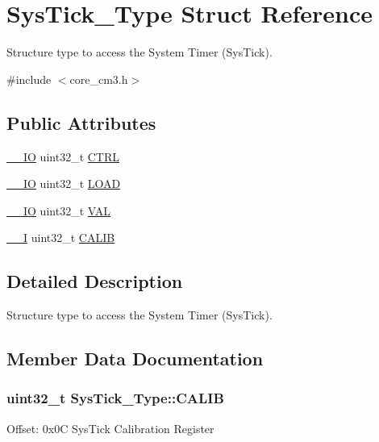 \hypertarget{struct_sys_tick___type}{\section{Sys\-Tick\-\_\-\-Type Struct Reference}
\label{struct_sys_tick___type}
}


Structure type to access the System Timer (Sys\-Tick).  




{\ttfamily \#include $<$core\-\_\-cm3.\-h$>$}

\subsection*{Public Attributes}
\begin{DoxyCompactItemize}
\item 
\hyperlink{group___c_m_s_i_s__core__definitions_gaec43007d9998a0a0e01faede4133d6be}{\-\_\-\-\_\-\-I\-O} uint32\-\_\-t \hyperlink{struct_sys_tick___type_af2ad94ac83e5d40fc6e34884bc1bec5f}{C\-T\-R\-L}
\item 
\hyperlink{group___c_m_s_i_s__core__definitions_gaec43007d9998a0a0e01faede4133d6be}{\-\_\-\-\_\-\-I\-O} uint32\-\_\-t \hyperlink{struct_sys_tick___type_ae7bc9d3eac1147f3bba8d73a8395644f}{L\-O\-A\-D}
\item 
\hyperlink{group___c_m_s_i_s__core__definitions_gaec43007d9998a0a0e01faede4133d6be}{\-\_\-\-\_\-\-I\-O} uint32\-\_\-t \hyperlink{struct_sys_tick___type_a0997ff20f11817f8246e8f0edac6f4e4}{V\-A\-L}
\item 
\hyperlink{group___c_m_s_i_s__core__definitions_gaf63697ed9952cc71e1225efe205f6cd3}{\-\_\-\-\_\-\-I} uint32\-\_\-t \hyperlink{struct_sys_tick___type_a9c9eda0ea6f6a7c904d2d75a6963e238}{C\-A\-L\-I\-B}
\end{DoxyCompactItemize}


\subsection{Detailed Description}
Structure type to access the System Timer (Sys\-Tick). 

\subsection{Member Data Documentation}
\hypertarget{struct_sys_tick___type_a9c9eda0ea6f6a7c904d2d75a6963e238}{
\subsubsection[{C\-A\-L\-I\-B}]{ uint32\-\_\-t Sys\-Tick\-\_\-\-Type\-::\-C\-A\-L\-I\-B}}\label{struct_sys_tick___type_a9c9eda0ea6f6a7c904d2d75a6963e238}
Offset\-: 0x0\-C Sys\-Tick Calibration Register

